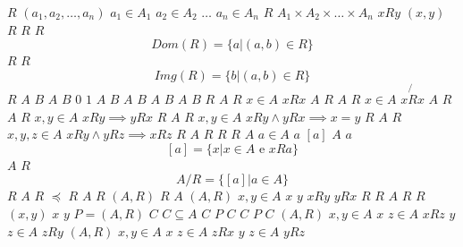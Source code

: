 \documentclass{article}
\begin{document}
$R$
$(a_1,a_2, \dots, a_n)$
$a_1 \in A_1$
$a_2 \in A_2$
$\dots$
$a_n \in A_n$
$R$
$A_1 \times A_2 \times \dots \times A_n$
$x R y$
$(x,y)$
$R$
$R$
$R$
$$
Dom(R) = \{a | (a,b) \in R\}
$$
$R$
$R$
$$
Img(R) = \{b | (a,b) \in R\}
$$
$R$
$A$
$B$
$A$
$B$
$0$
$1$
$A$
$B$
$A$
$B$
$A$
$B$
$A$
$B$
$R$
$A$
$R$
$x \in A$
$x R x$
$A$
$R$
$A$
$R$
$x \in A$
$x \not{R} x$
$A$
$R$
$A$
$R$
$x, y \in A$
$x R y \implies y R x$
$R$
$A$
$R$
$x, y \in A$
$x R y \land y R x \implies x = y$
$R$
$A$
$R$
$x, y, z \in A$
$x R y \land y R z \implies x R z$
$R$
$A$
$R$
$R$
$R$
$A$
$a \in A$
$a$
$[a]$
$A$
$a$
$$
[a] = \{x | x \in A \text{ e } x R a\}
$$
$A$
$R$
$$
A/R = \{[a] | a \in A\}
$$
$R$
$A$
$R$
$\preceq $
$R$
$A$
$R$
$(A, R)$
$R$
$A$
$(A, R)$
$x, y \in A$
$x$
$y$
$x R y$
$y R x$
$R$
$R$
$A$
$R$
$R$
$(x,y)$
$x$
$y$
$P = (A, R)$
$C$
$C \subseteq A$
$C$
$P$
$C$
$C$
$P$
$C$
$(A,R)$
$x, y \in A$
$x$
$z \in A$
$x R z$
$y$
$z \in A$
$z R y$
$(A,R)$
$x, y \in A$
$x$
$z \in A$
$z R x$
$y$
$z \in A$
$y R z$
\end{document}
